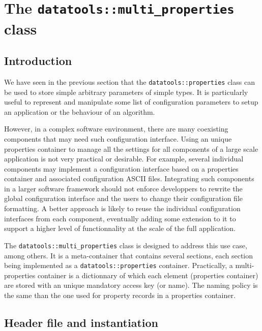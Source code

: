 
\section{The \texttt{datatools::multi\_properties} class}\label{sec:multi_properties}

\subsection{Introduction}

We    have    seen    in     the    previous    section    that    the
\texttt{datatools::properties}  class  can  be  used  to  store
simple arbitrary parameters of simple types. It is particularly useful
to represent  and manipulate some list of  configuration parameters to
setup an application or the behaviour of an algorithm.

\pn However, in a complex  software environment, there are many coexisting
components that may need such configuration interface. Using an unique
properties container to manage all  the settings for all components of
a large  scale application  is not very  practical or  desirable.  For
example, several  individual components may  implement a configuration
interface based on a properties container and associated configuration
ASCII  files.   Integrating  such  components  in  a  larger  software
framework  should  not  enforce  developpers  to  rewrite  the  global
configuration interface  and the  users to change  their configuration
file formatting.  A better approach  is likely to reuse the individual
configuration interfaces  from each component,  eventually adding some
extension to  it to  support a higher  level of functionnality  at the
scale of the full application.

\pn The \texttt{datatools::multi\_properties}  class is designed to
address  this use  case, among  others.  It  is a  meta-container that
contains  several  sections,  each  section  being  implemented  as  a
\texttt{datatools::properties}   container.    Practically,   a
multi-properties  container is  a  dictionnary of  which each  element
(properties container) are stored  with an unique mandatory access key
(or  name).  The  naming policy  is  the same  than the  one used  for
property records in a properties container.


\subsection{Header file and instantiation}

